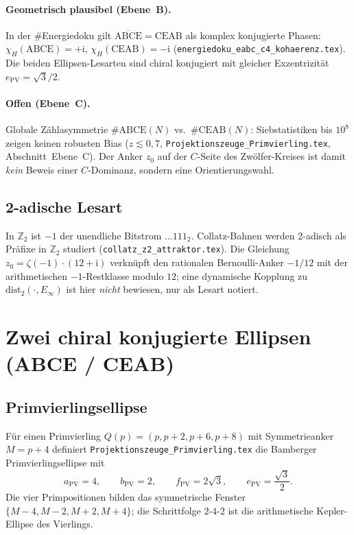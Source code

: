 \documentclass[11pt,a4paper]{article}
\theoremstyle{definition}
\theoremstyle{remark}
\newcommand{\Ztwo}{\mathbb{Z}_2}
\newcommand{\Einf}{E_{\infty}}
\newcommand{\dist}{\mathrm{dist}}
\begin{document}
\paragraph{Geometrisch plausibel (Ebene~B).}
In der \#Energiedoku gilt
$\overline{\mathrm{ABCE}}=\mathrm{CEAB}$ als komplex konjugierte
Phasen: $\chi_H(\mathrm{ABCE})=+\mathrm{i}$,
$\chi_H(\mathrm{CEAB})=-\mathrm{i}$
(\texttt{energiedoku\_eabc\_c4\_kohaerenz.tex}).
Die beiden Ellipsen-Lesarten sind chiral konjugiert mit gleicher
Exzentrizität $e_{\mathrm{PV}}=\sqrt{3}/2$.

\paragraph{Offen (Ebene~C).}
Globale Zählasymmetrie $\#\mathrm{ABCE}(N)$ vs.\ $\#\mathrm{CEAB}(N)$:
Siebstatistiken bis $10^8$ zeigen keinen robusten Bias
($z\lesssim 0{,}7$, \texttt{Projektionszeuge\_Primvierling.tex},
Abschnitt~Ebene~C). Der Anker $z_0$ auf der $C$-Seite des
Zwölfer-Kreises ist damit \emph{kein} Beweis einer $C$-Dominanz,
sondern eine Orientierungswahl.

\subsection{2-adische Lesart}

In $\Ztwo$ ist $-1$ der unendliche Bitstrom $\ldots 111_2$.
Collatz-Bahnen werden 2-adisch als Präfixe in $\Ztwo$ studiert
(\texttt{collatz\_z2\_attraktor.tex}). Die Gleichung $z_0=\zeta(-1)\cdot(12+\mathrm{i})$
verknüpft den rationalen Bernoulli-Anker $-1/12$ mit der
arithmetischen $-1$-Restklasse modulo $12$; eine dynamische
Kopplung zu $\dist_2(\cdot,\Einf)$ ist hier \emph{nicht} bewiesen,
nur als Lesart notiert.

\section{Zwei chiral konjugierte Ellipsen (ABCE / CEAB)}

\subsection{Primvierlingsellipse}

Für einen Primvierling $Q(p)=(p,p+2,p+6,p+8)$ mit Symmetrieanker
$M=p+4$ definiert \texttt{Projektionszeuge\_Primvierling.tex} die
Bamberger Primvierlingsellipse mit
\[
a_{\mathrm{PV}}=4,\qquad b_{\mathrm{PV}}=2,\qquad
f_{\mathrm{PV}}=2\sqrt{3},\qquad
e_{\mathrm{PV}}=\frac{\sqrt{3}}{2}.
\]
Die vier Primpositionen bilden das symmetrische Fenster
$\{M-4,M-2,M+2,M+4\}$; die Schrittfolge $2$-$4$-$2$ ist die
arithmetische Kepler-Ellipse des Vierlings.
\end{document}
